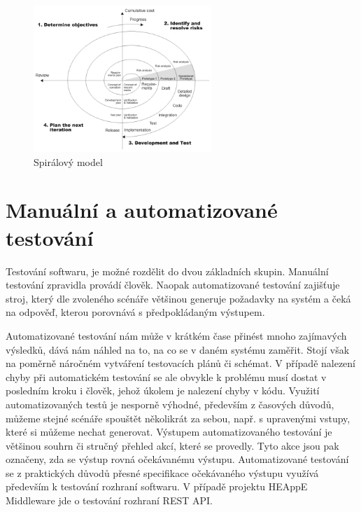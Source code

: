 \begin{figure}
	\centering
	\includegraphics[width=0.6\textwidth]{Figures/Spiral_model_Boehm_1988.png}
	\caption{Spirálový model \cite{ee27bbyhk5LP1Ekm}}
	\label{fig:WritingThesis}
\end{figure}

\section{Manuální a automatizované testování}
Testování softwaru, je možné rozdělit do dvou základních skupin.  Manuální testování zpravidla provádí člověk. Naopak automatizované testování zajišťuje stroj, který dle zvoleného scénáře většinou generuje požadavky na systém a čeká na odpověď, kterou porovnává s předpokládaným výstupem.

Automatizované testování nám může v krátkém čase přinést mnoho zajímavých výsledků, dává nám náhled na to, na co se v daném systému zaměřit. Stojí však na poměrně náročném vytváření testovacích plánů či schémat. V případě nalezení chyby při automatickém testování se ale obvykle k problému musí dostat v posledním kroku i člověk, jehož úkolem je nalezení chyby v kódu. Využití automatizovaných testů je nesporně výhodné, především z časových důvodů, můžeme stejné scénáře spouštět několikrát za sebou, např. s upravenými vstupy, které si můžeme nechat generovat. Výstupem automatizovaného testování je většinou souhrn či stručný přehled akcí, které se provedly. Tyto akce jsou pak označeny, zda se výstup rovná očekávanému výstupu. Automatizované testování se z praktických důvodů přesné specifikace očekávaného výstupu využívá především k testování rozhraní softwaru. V případě projektu HEAppE Middleware jde o testování rozhraní REST API.

